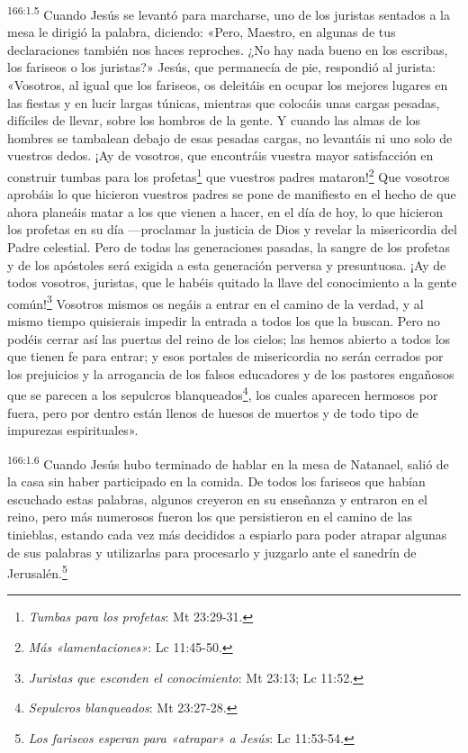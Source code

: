 \par 
\textsuperscript{166:1.5} Cuando Jesús se levantó para marcharse, uno de los juristas sentados a la mesa le dirigió la palabra, diciendo: «Pero, Maestro, en algunas de tus declaraciones también nos haces reproches. ¿No hay nada bueno en los escribas, los fariseos o los juristas?» Jesús, que permanecía de pie, respondió al jurista: «Vosotros, al igual que los fariseos, os deleitáis en ocupar los mejores lugares en las fiestas y en lucir largas túnicas, mientras que colocáis unas cargas pesadas, difíciles de llevar, sobre los hombros de la gente. Y cuando las almas de los hombres se tambalean debajo de esas pesadas cargas, no levantáis ni uno solo de vuestros dedos. ¡Ay de vosotros, que encontráis vuestra mayor satisfacción en construir tumbas para los profetas\footnote{\textit{Tumbas para los profetas}: Mt 23:29-31.} que vuestros padres mataron!\footnote{\textit{Más «lamentaciones»}: Lc 11:45-50.} Que vosotros aprobáis lo que hicieron vuestros padres se pone de manifiesto en el hecho de que ahora planeáis matar a los que vienen a hacer, en el día de hoy, lo que hicieron los profetas en su día ---proclamar la justicia de Dios y revelar la misericordia del Padre celestial. Pero de todas las generaciones pasadas, la sangre de los profetas y de los apóstoles será exigida a esta generación perversa y presuntuosa. ¡Ay de todos vosotros, juristas, que le habéis quitado la llave del conocimiento a la gente común!\footnote{\textit{Juristas que esconden el conocimiento}: Mt 23:13; Lc 11:52.} Vosotros mismos os negáis a entrar en el camino de la verdad, y al mismo tiempo quisierais impedir la entrada a todos los que la buscan. Pero no podéis cerrar así las puertas del reino de los cielos; las hemos abierto a todos los que tienen fe para entrar; y esos portales de misericordia no serán cerrados por los prejuicios y la arrogancia de los falsos educadores y de los pastores engañosos que se parecen a los sepulcros blanqueados\footnote{\textit{Sepulcros blanqueados}: Mt 23:27-28.}, los cuales aparecen hermosos por fuera, pero por dentro están llenos de huesos de muertos y de todo tipo de impurezas espirituales».

\par 
\textsuperscript{166:1.6} Cuando Jesús hubo terminado de hablar en la mesa de Natanael, salió de la casa sin haber participado en la comida. De todos los fariseos que habían escuchado estas palabras, algunos creyeron en su enseñanza y entraron en el reino, pero más numerosos fueron los que persistieron en el camino de las tinieblas, estando cada vez más decididos a espiarlo para poder atrapar algunas de sus palabras y utilizarlas para procesarlo y juzgarlo ante el sanedrín de Jerusalén.\footnote{\textit{Los fariseos esperan para «atrapar» a Jesús}: Lc 11:53-54.}

